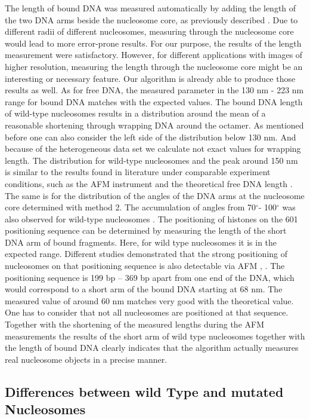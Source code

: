 \documentclass{article}
\begin{document}
The length of bound DNA was measured automatically by adding the length of the two DNA arms beside the nucleosome core, as previously described \cite{montel2007atomic}. Due to different radii of different nucleosomes, measuring through the nucleosome core would lead to more error-prone results. For our purpose, the results of the length measurement were satisfactory. However, for different applications with images of higher resolution, measuring the length through the nucleosome core might be an interesting or necessary feature. Our algorithm is already able to produce those results as well. As for free DNA, the measured parameter in the 130 nm - 223 nm range for bound DNA matches with the expected values. The bound DNA length of wild-type nucleosomes results in a distribution around the mean of a reasonable shortening through wrapping DNA around the octamer. As mentioned before one can also consider the left side of the distribution below 130 nm. And because of the heterogeneous data set we calculate not exact values for wrapping length. The distribution for wild-type nucleosomes and the peak around 150 nm is similar to the results found in literature under comparable experiment conditions, such as the AFM instrument and the theoretical free DNA length \cite{kepert2003conformation}. 
The same is for the distribution of the angles of the DNA arms at the nucleosome core determined with method 2. The accumulation of angles from 70$^\circ$- 100$^\circ$ was also observed for wild-type nucleosomes \cite{kepert2003conformation}.
The positioning of histones on the 601 positioning sequence can be determined by measuring the length of the short DNA arm of bound fragments. Here, for wild type nucleosomes it is in the expected range. Different studies demonstrated that the strong positioning of nucleosomes on that positioning sequence is also detectable via AFM \cite{nazarov2016afm}, \cite{nishikawa2012selective}. The positioning sequence is 199 bp – 369 bp apart from one end of the DNA, which would correspond to a short arm of the bound DNA starting at 68 nm. The measured value of around 60 nm matches very good with the theoretical value. One has to consider that not all nucleosomes are positioned at that sequence. Together with the shortening of the measured lengths during the AFM measurements the results of the short arm of wild type nucleosomes together with the length of bound DNA clearly indicates that the algorithm actually measures real nucleosome objects in a precise manner.

\subsection{Differences between wild Type and mutated Nucleosomes}
\end{document}
